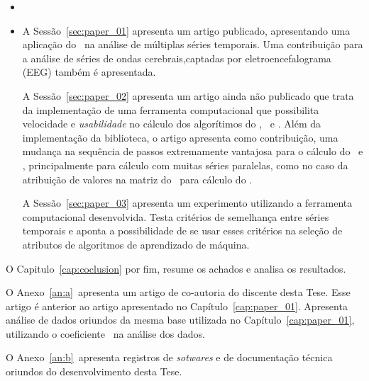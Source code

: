 \begin{itemize}
    \item 

\item A Sessão~\ref{sec:paper_01} apresenta um artigo publicado, apresentando uma aplicação do \dmc~na análise de múltiplas séries temporais. Uma contribuição para a análise de séries de ondas cerebrais,captadas por eletroencefalograma (EEG) também é apresentada.

A Sessão~\ref{sec:paper_02} apresenta um artigo ainda não publicado que trata da implementação de uma ferramenta computacional que possibilita velocidade e \emph{usabilidade} no cálculo dos algorítimos do \dfa, \dcca~e \pdcca. Além da implementação da biblioteca, o artigo apresenta como contribuição, uma mudança na sequência de passos extremamente vantajosa para o cálculo do \dcca~e \pdcca, principalmente para cálculo com muitas séries paralelas, como no caso da atribuição de valores na matriz do \pdcca~para cálculo do \dmc.

A Sessão~\ref{sec:paper_03} apresenta um experimento utilizando a ferramenta computacional desenvolvida. Testa critérios de semelhança entre séries temporais e aponta a possibilidade de se usar esses critérios na seleção de atributos de algoritmos de aprendizado de máquina.

\end{itemize}

O Capitulo~\ref{cap:coclusion} por fim, resume os achados e analisa os resultados.

O Anexo~\ref{an:a}~apresenta um artigo de co-autoria do discente desta Tese. Esse artigo é anterior ao artigo apresentado no Capítulo~\ref{cap:paper_01}. Apresenta análise de dados oriundos da mesma base utilizada no Capítulo~\ref{cap:paper_01}, utilizando o coeficiente \pdcca~na análise dos dados.

O Anexo~\ref{an:b}~apresenta registros de \emph{sotwares} e de documentação técnica oriundos do desenvolvimento desta Tese.

